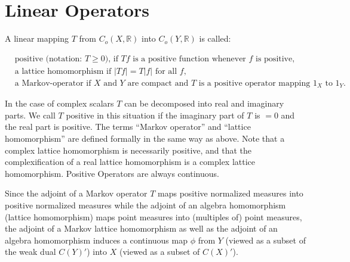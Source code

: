 \section{Linear Operators}\label{sec:b1-3}

A linear mapping $T$ from $C_{o}(X,\mathbb{R})$ into $C_{o}(Y,\mathbb{R})$ is called:

\[
\begin{aligned}
	&\text{positive (notation: } T \geq 0 \text{), if } Tf \text{ is a positive function whenever } f \text{ is positive,} \\
	&\text{a lattice homomorphism if } |Tf| = T|f| \text{ for all } f, \\
&\text{a Markov-operator if } X \text{ and } Y \text{ are compact and } T \text{ is a positive operator mapping } 1_{X} \text{ to } 1_{Y}.
\end{aligned}
\]

In the case of complex scalars $T$ can be decomposed into real and imaginary parts.
We call $T$ positive in this situation if the imaginary part of $T$ is $= 0$ and the real part is positive.
The terms \enquote{Markov operator} and \enquote{lattice homomorphism} are defined formally in the same way as above.
Note that a complex lattice homomorphism is necessarily positive, and that the complexification of a real lattice homomorphism is a complex lattice homomorphism.
Positive Operators are always continuous.

Since the adjoint of a Markov operator $T$ maps positive normalized measures into positive normalized measures while the adjoint of an algebra homomorphism (lattice homomorphism) maps point measures into (multiples of) point measures, the adjoint of a Markov lattice homomorphism as well as the adjoint of an algebra homomorphism induces a continuous map $\phi$ from $Y$ (viewed as a subset of the weak dual $C(Y)'$) into $X$ (viewed as a subset of $C(X)'$).

